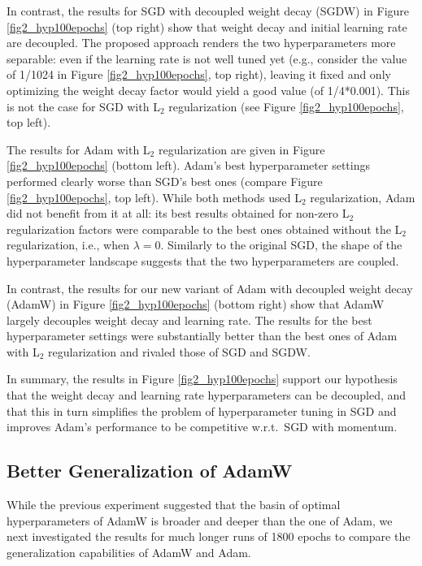 In contrast, the results for SGD with decoupled weight decay (SGDW) in Figure \ref{fig2_hyp100epochs} (top right) show that weight decay and initial learning rate are decoupled. The proposed approach renders the two hyperparameters more separable: even if the learning rate is not well tuned yet (e.g., consider the value of 1/1024 in Figure \ref{fig2_hyp100epochs}, top right), leaving it fixed and only optimizing the weight decay factor would yield a good value (of 1/4*0.001). This is not the case for SGD with L$_2$ regularization (see Figure \ref{fig2_hyp100epochs}, top left). 

The results for Adam with L$_2$ regularization are given in Figure \ref{fig2_hyp100epochs} (bottom left). Adam's best hyperparameter settings performed clearly worse than SGD's best ones (compare Figure \ref{fig2_hyp100epochs}, top left). While both methods used L$_2$ regularization,  Adam did not benefit from it at all: its best results obtained for non-zero L$_2$ regularization factors were comparable to the best ones obtained without the L$_2$ regularization, i.e., when $\lambda=0$.   
Similarly to the original SGD, the shape of the hyperparameter landscape suggests that the two hyperparameters are coupled. 

In contrast, the results for our new variant of Adam with decoupled weight decay (AdamW) in Figure \ref{fig2_hyp100epochs} (bottom right) show that AdamW largely decouples weight decay and learning rate. The results for the best hyperparameter settings were substantially better than the best ones of Adam with L$_2$ regularization and rivaled those of SGD and SGDW. 

In summary, the results in Figure \ref{fig2_hyp100epochs} support our hypothesis that the weight decay and learning rate hyperparameters can be decoupled, and that this in turn simplifies the problem of hyperparameter tuning in SGD and improves Adam's performance to be competitive w.r.t.\ SGD with momentum. 

\subsection{Better Generalization of AdamW}\label{sec:exp_generalization}

While the previous experiment suggested that the basin of optimal hyperparameters of AdamW is broader and deeper than the one of Adam, we next investigated the results for much longer runs of 1800 epochs to compare the generalization capabilities of AdamW and Adam.

